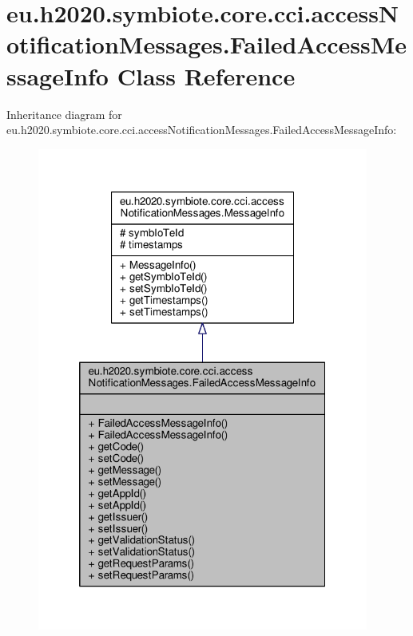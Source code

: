 \hypertarget{classeu_1_1h2020_1_1symbiote_1_1core_1_1cci_1_1accessNotificationMessages_1_1FailedAccessMessageInfo}{}\section{eu.\+h2020.\+symbiote.\+core.\+cci.\+access\+Notification\+Messages.\+Failed\+Access\+Message\+Info Class Reference}
\label{classeu_1_1h2020_1_1symbiote_1_1core_1_1cci_1_1accessNotificationMessages_1_1FailedAccessMessageInfo}


Inheritance diagram for eu.\+h2020.\+symbiote.\+core.\+cci.\+access\+Notification\+Messages.\+Failed\+Access\+Message\+Info\+:\nopagebreak
\begin{figure}[H]
\begin{center}
\leavevmode
\includegraphics[width=308pt]{classeu_1_1h2020_1_1symbiote_1_1core_1_1cci_1_1accessNotificationMessages_1_1FailedAccessMessageInfo__inherit__graph}
\end{center}
\end{figure}


